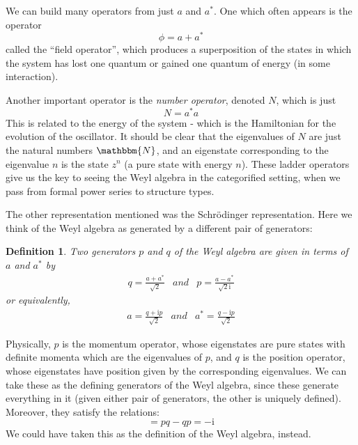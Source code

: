 \documentclass{amsart} \usepackage{amsmath,amssymb,bbm}
\newtheorem{definition}{Definition}
\newcommand{\mathi}{\mathrm{i}}
\begin{document}
We can build many operators from just $a$ and $a^{\ast}$.  One which
often appears is the operator
\begin{equation}\label{eq:fieldoperatordef}
  \phi = a + a^{\ast}
\end{equation} called the ``field operator'', which produces a
superposition of the states in which the system has lost one quantum
or gained one quantum of energy (in some interaction).

Another important operator is the {\textit{number operator}}, denoted
$N$, which is just
\begin{equation}
N=a^{\ast}a
\end{equation}
This is related to the energy of the system - which is the Hamiltonian
for the evolution of the oscillator.  It should be clear that the
eigenvalues of $N$ are just the natural numbers $\mathbbm{N}$, and an
eigenstate corresponding to the eigenvalue $n$ is the state $z^n$ (a
pure state with energy $n$).  These ladder operators give us the key
to seeing the Weyl algebra in the categorified setting, when we pass
from formal power series to structure types.

The other representation mentioned was the Schr\"odinger representation.
Here we think of the Weyl algebra as generated by a different pair of
generators:

\begin{definition}
  Two generators $p$ and $q$ of the Weyl algebra are
  given in terms of $a$ and $a^{\ast}$ by 
\begin{equation}
 \begin{array}{lll}
  q=\frac{a+a^{\ast}}{\sqrt{2}} &
  and &
  p=\frac{a-a^{\ast}}{\sqrt{2} \mathi}
 \end{array}
\end{equation}
or equivalently,
\begin{equation}
 \begin{array}{lll}
  a= \frac{q+ \mathi p}{\sqrt{2}} &
  and &
  a^{\ast} = \frac{q- \mathi p}{\sqrt{2}}
 \end{array}
\end{equation}
\end{definition}

Physically, $p$ is the momentum operator, whose eigenstates are
pure states with definite momenta which are the eigenvalues of $p$,
and $q$ is the position operator, whose eigenstates have position
given by the corresponding eigenvalues.  We can take these as the defining
generators of the Weyl algebra, since these generate everything in it (given
either pair of generators, the other is uniquely defined).  Moreover, they
satisfy the relations:
\begin{equation}
 [p,q] =p q - q p = -\mathi
\end{equation}
We could have taken this as the definition of the Weyl algebra, instead.
\end{document}
